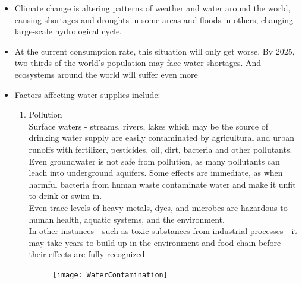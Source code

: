 \begin{itemize}
\item Climate change is altering patterns of weather and water around the world, causing shortages and droughts in some areas and floods in others, changing large-scale hydrological cycle.\\
\item At the current consumption rate, this situation will only get worse. By 2025, two-thirds of the world’s population may face water shortages. And ecosystems around the world will suffer even more\\
\item Factors affecting water supplies include:
\begin{enumerate}
\item Pollution\\
Surface waters - streams, rivers, lakes which may be the source of drinking water supply are easily contaminated by agricultural and urban runoffs with fertilizer, pesticides, oil, dirt, bacteria and other pollutants.\\
\vspace{0.2cm}
Even groundwater is not safe from pollution, as many pollutants can leach into underground aquifers. Some effects are immediate, as when harmful bacteria from human waste contaminate water and make it unfit to drink or swim in.\\
\vspace{0.2cm}
Even trace levels of heavy metals, dyes, and microbes are hazardous to human health, aquatic systems, and the environment.\\
\vspace{0.2cm}
In other instances—such as toxic substances from industrial processes—it may take years to build up in the environment and food chain before their effects are fully recognized.\\
\begin{figure}[htp]
\begin{center}
\texttt{[image: WaterContamination]}\\
\end{center}
\end{figure}



\end{enumerate}
\end{itemize}
